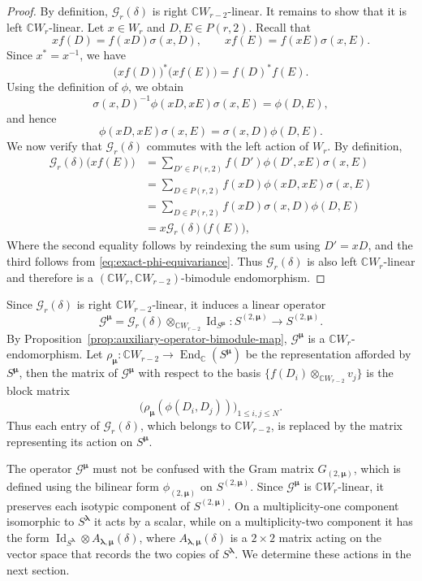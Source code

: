 \documentclass[10pt,a4paper]{amsart}
\newcommand{\C}{\mathbb{C}}
\newcommand{\1}{\mathfrak{1}}
\begin{document}
\begin{proof}
By definition, $\mathcal G_r(\delta)$ is right $\C W_{r-2}$-linear. It remains to show that it is left $\C W_r$-linear. Let $x\in W_r$ and
$D,E\in P(r,2)$. Recall that
$$
xf(D)=f(xD)\sigma(x,D), \qquad xf(E)=f(xE)\sigma(x,E).
$$
Since $x^*=x^{-1}$, we have
$$
\bigl(xf(D)\bigr)^*\bigl(xf(E)\bigr)=f(D)^*f(E).
$$
Using the definition of $\phi$, we obtain
$$
\sigma(x,D)^{-1}\phi(xD,xE)\sigma(x,E)=\phi(D,E),
$$
and hence
\begin{equation}\label{eq:exact-phi-equivariance}
\phi(xD,xE)\sigma(x,E) = \sigma(x,D)\phi(D,E).
\end{equation}
We now verify that $\mathcal G_r(\delta)$ commutes with the left action of $W_r$. By definition,
$$
\begin{aligned}
\mathcal G_r(\delta)\bigl(xf(E)\bigr)
&=\sum_{D'\in P(r,2)}
f(D')\phi(D',xE)\sigma(x,E)\\
&=\sum_{D\in P(r,2)}
f(xD)\phi(xD,xE)\sigma(x,E)\\
&=\sum_{D\in P(r,2)}
f(xD)\sigma(x,D)\phi(D,E)\\
&=x\mathcal G_r(\delta)\bigl(f(E)\bigr),
\end{aligned}
$$
Where the second equality follows by reindexing the sum using $D'=xD$, and the third follows from
\eqref{eq:exact-phi-equivariance}. Thus
$\mathcal G_r(\delta)$ is also left $\C W_r$-linear and therefore is a $(\C W_r,\C W_{r-2})$-bimodule endomorphism.
\end{proof}

Since $\mathcal G_r(\delta)$ is right $\C W_{r-2}$-linear, it induces a linear operator
\begin{equation}\label{eq:exact-induced-operator}
\mathcal G^{\bm\mu}= \mathcal G_r(\delta)\otimes_{\C W_{r-2}}\operatorname{Id}_{S^{\bm\mu}}:S^{(2,\bm\mu)}\longrightarrow S^{(2,\bm\mu)}.
\end{equation}
By Proposition~\ref{prop:auxiliary-operator-bimodule-map}, $\mathcal G^{\bm\mu}$ is a $\C W_r$-endomorphism. Let $\rho_{\bm\mu}:\C W_{r-2}\longrightarrow\operatorname{End}_{\C}(S^{\bm\mu})$ be the representation afforded by $S^{\bm\mu}$, then the matrix of
$\mathcal G^{\bm\mu}$ with respect to the basis $\{f(D_i)\otimes_{\C W_{r-2}} v_j\}$ is the block matrix
$$
\bigl(\rho_{\bm\mu}(\phi(D_i,D_j))\bigr)_{1\leq i,j\leq N}.
$$
Thus each entry of $\mathcal G_r(\delta)$, which
belongs to $\C W_{r-2}$, is replaced by the matrix representing its action on $S^{\bm\mu}$.

The operator $\mathcal G^{\bm\mu}$ must not be confused with the Gram matrix $G_{(2,\bm\mu)}$, which is defined using the bilinear form $\phi_{(2, \bm\mu)}$ on $S^{(2,\bm\mu)}$. Since $\mathcal G^{\bm\mu}$
is $\C W_r$-linear, it preserves each isotypic component of $S^{(2,\bm\mu)}$. On a multiplicity-one component isomorphic to $S^{\bm\lambda}$ it acts by a scalar, while on a multiplicity-two component it has the form $\operatorname{Id}_{S^{\bm\lambda}}\otimes A_{\bm\lambda,\bm\mu}(\delta)$, where $A_{\bm\lambda,\bm\mu}(\delta)$ is a $2\times2$ matrix acting on the vector space that records the two copies of $S^{\bm\lambda}$. We determine these actions in the next section.
\end{document}
